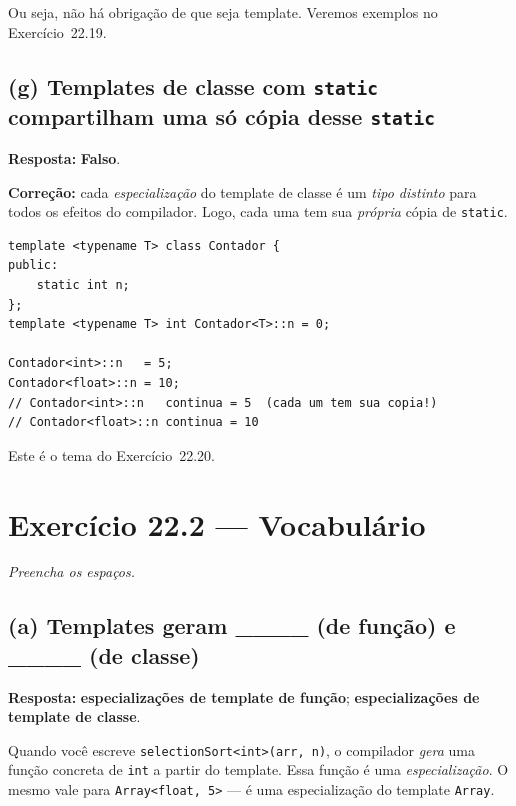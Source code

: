\documentclass[11pt,a4paper]{article}
\begin{document}
Ou seja, n\~ao h\'a obriga\c{c}\~ao de que seja template. Veremos exemplos no Exerc\'icio~22.19.

\subsection*{(g) Templates de classe com \texttt{static} compartilham uma s\'o c\'opia desse \texttt{static}}

\begin{resposta}\textbf{Resposta:} \textbf{Falso}.\end{resposta}

\textbf{Corre\c{c}\~ao:} cada \emph{especializa\c{c}\~ao} do template de classe \'e um \emph{tipo distinto} para todos os efeitos do compilador. Logo, cada uma tem sua \emph{pr\'opria} c\'opia de \texttt{static}.

\begin{lstlisting}[style=cppcode,numbers=none]
template <typename T> class Contador {
public:
    static int n;
};
template <typename T> int Contador<T>::n = 0;

Contador<int>::n   = 5;
Contador<float>::n = 10;
// Contador<int>::n   continua = 5  (cada um tem sua copia!)
// Contador<float>::n continua = 10
\end{lstlisting}

Este \'e o tema do Exerc\'icio~22.20.

\section{Exerc\'icio 22.2 --- Vocabul\'ario}

\textit{Preencha os espa\c{c}os.}

\subsection*{(a) Templates geram \_\_\_\_ (de fun\c{c}\~ao) e \_\_\_\_ (de classe)}

\begin{resposta}\textbf{Resposta:} \textbf{especializa\c{c}\~oes de template de fun\c{c}\~ao}; \textbf{especializa\c{c}\~oes de template de classe}.\end{resposta}

Quando voc\^e escreve \texttt{selectionSort<int>(arr, n)}, o compilador \emph{gera} uma fun\c{c}\~ao concreta de \texttt{int} a partir do template. Essa fun\c{c}\~ao \'e uma \emph{especializa\c{c}\~ao}. O mesmo vale para \texttt{Array<float, 5>} --- \'e uma especializa\c{c}\~ao do template \texttt{Array}.
\end{document}
